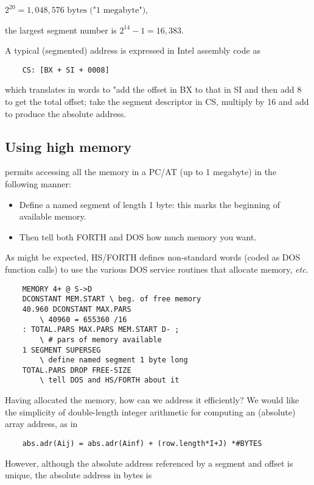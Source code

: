 $2^{20} = 1,048,576 \textrm{ bytes ("1 megabyte")}$,

the largest segment number is $2^{14}-1 = 16,383$.

A typical (segmented) address is expressed in Intel assembly code
as

\begin{lstlisting}
    CS: [BX + SI + 0008]
\end{lstlisting}

which translates in words to "add the offset in BX to that in SI and then add 8 to get the total offset; take the segment descriptor in CS, multiply by 16 and add to produce the absolute address.

\subsection{Using high memory}
 permits accessing all the memory in a PC/AT (up
to 1 megabyte) in the following manner:
\begin{itemize}
    \item Define a named segment of length 1 byte: this marks the beginning of available memory.
    \item Then tell both FORTH and DOS how much memory you want.
\end{itemize} 

As might be expected, HS/FORTH defines non-standard words (coded as DOS function calls) to use the various DOS service routines that allocate memory, \textit{etc}.

\begin{lstlisting}
    MEMORY 4+ @ S->D
    DCONSTANT MEM.START \ beg. of free memory
    40.960 DCONSTANT MAX.PARS
        \ 40960 = 655360 /16
    : TOTAL.PARS MAX.PARS MEM.START D- ;
        \ # pars of memory available
    1 SEGMENT SUPERSEG
        \ define named segment 1 byte long
    TOTAL.PARS DROP FREE-SIZE
        \ tell DOS and HS/FORTH about it
\end{lstlisting}

Having allocated the memory, how can we address it efficiently? We would like the simplicity of double-length integer arithmetic for computing an (absolute) array address, as in

\begin{lstlisting}
    abs.adr(Aij) = abs.adr(Ainf) + (row.length*I+J) *#BYTES
\end{lstlisting}

However, although the absolute address referenced by a segment and offset is unique, \ie the absolute address in bytes is

